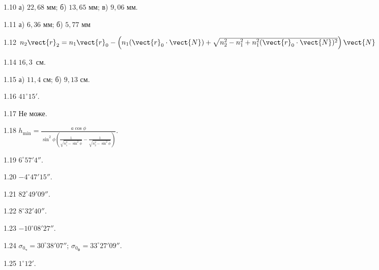 \protect \section *{}
\begin{Solution}{1.{10}}
	а) $22,68$ мм; б) $13,65$ мм; в) $9,06$ мм.
\end{Solution}
\begin{Solution}{1.{11}}
	а) $6,36$ мм; б) $5,77$ мм
\end{Solution}
\begin{Solution}{1.{12}}
	$n_2\vect{r}_2 = n_1\vect{r}_0 - \left( n_1 (\vect{r}_0 \cdot \vect{N}) + \sqrt{n_2^2 - n_1^2 + n_1^2 (\vect{r}_0 \cdot \vect{N})^2} \right)\vect{N} $
\end{Solution}
\begin{Solution}{1.{14}}
	$16,3$~см.
\end{Solution}
\begin{Solution}{1.{15}}
	а) $11,4$ см; б) $9,13$ см.
\end{Solution}
\begin{Solution}{1.{16}}
	$41^\circ15'$.
\end{Solution}
\begin{Solution}{1.{17}}
	Не може.
\end{Solution}
\begin{Solution}{1.{18}}
	$h_{\min} = \frac{a\cos\phi}{\sin^2\phi \left( \frac{1}{\sqrt{n_1^2 - \sin^2\phi}}  - \frac{1}{\sqrt{n_2^2 - \sin^2\phi}} \right) }$.
\end{Solution}
\begin{Solution}{1.{19}}
	$6^\circ 57'4''$.
\end{Solution}
\begin{Solution}{1.{20}}
	$-4^\circ47'15''$.
\end{Solution}
\begin{Solution}{1.{21}}
	$82^\circ49'09''$.
\end{Solution}
\begin{Solution}{1.{22}}
	$8^\circ32'40''$.
\end{Solution}
\begin{Solution}{1.{23}}
	$-10^\circ08'27''$.
\end{Solution}
\begin{Solution}{1.{24}}
	$\sigma_{0_\text{ч}} = 30^\circ38'07''$; $\sigma_{0_\text{ф}} = 33^\circ27'09''$.
\end{Solution}
\begin{Solution}{1.{25}}
	$1^\circ12'$.
\end{Solution}
